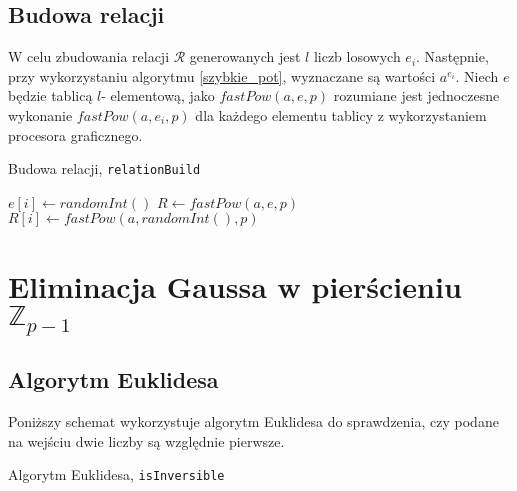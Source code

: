 \documentclass[]{article}
\begin{document}
	\subsection{Budowa relacji}
		W celu zbudowania relacji \(\mathcal{R}\) generowanych jest \(l\) liczb losowych \(e_i\). Następnie, przy wykorzystaniu algorytmu \ref{szybkie_pot}, wyznaczane są wartości \(a^{e_i}\). 
		\newline
		Niech \(e\) będzie tablicą \(l\)- elementową, jako \(fastPow(a, e, p)\) rozumiane jest jednoczesne wykonanie \(fastPow(a, e_i, p)\) dla każdego elementu tablicy z wykorzystaniem procesora graficznego. 
		\newline
		\begin{algorithm}[H]
			\SetAlgoLined
			\caption{Budowa relacji, \texttt{relationBuild}}
			\label{relation}
			{
				\(e[i] \gets randomInt()\)
			}
			\(R \gets fastPow(a, e, p)\) \\
			{
				{
					\(R[i] \gets fastPow(a, randomInt(), p)\)
				}
			}
		
		\end{algorithm}


\newpage
\section{Eliminacja Gaussa w pierścieniu \(\mathbb{Z}_{p-1}\)}
	\subsection{Algorytm Euklidesa}
		Poniższy schemat wykorzystuje algorytm Euklidesa do sprawdzenia, czy podane na wejściu dwie liczby są względnie pierwsze. \\
	\begin{algorithm}[H]
		\label{Euklid}
		\caption{Algorytm Euklidesa, \texttt{isInversible}}
		\BlankLine
		
	\end{algorithm}
\end{document}
